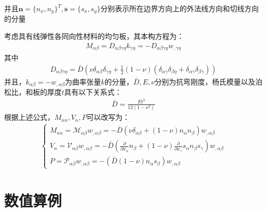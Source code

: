 \documentclass[11pt,a4paper]{article}
\begin{document}
并且$\pmb{n}=\{n_x,n_y\}^T,\pmb{s}=\{s_x,s_y\}$分别表示所在边界方向上的外法线方向和切线方向的分量\par
考虑具有线弹性各同向性材料的均匀板，其本构方程为：
\begin{equation}
    \begin{split}
    M_{\alpha\beta}=D_{\alpha\beta\gamma\eta}k_{\gamma\eta}=-D_{\alpha\beta\gamma\eta}w_{,\gamma\eta}
    \end{split}
    \end{equation}
其中
\begin{equation}
    \begin{split}
    D_{\alpha\beta\gamma\eta}=\bar D(\nu\delta_{\alpha\beta}\delta_{\gamma\eta}+\frac{1}{2}(1-\nu)(\delta_{\alpha\gamma}\delta_{\beta\eta}+\delta_{\alpha\gamma}\delta_{\beta\gamma}))
    \end{split}
    \end{equation}
并且，$k_{\alpha\beta}=-w_{,\alpha\beta}$为曲率张量$k$的分量，$\bar{D},E,\nu$分别为抗弯刚度，杨氏模量以及泊松比，和板的厚度$t$具有以下关系式：
\begin{equation}
    \begin{split}
    \bar D=\frac{Et^3}{12(1-\nu^2)}
    \end{split}
    \end{equation}
根据上述公式，$M_{nn},V_n,P$可以改写为：
\begin{equation}
    \begin{split}
    \begin{cases}
    M_{nn}=\mathcal{M}_{\alpha\beta}w_{,\alpha\beta}=-\bar D(\nu\delta_{\alpha\beta}+(1-\nu)n_{\alpha}n_{\beta})w_{,\alpha\beta}\\
    V_n=\mathcal{V}_{\alpha\beta}w_{,\alpha\beta}=-\bar D(\frac{\partial}{\partial x_{\alpha}}n_{\beta}+(1-\nu)\frac{\partial}{\partial x_{\gamma}}s_{\alpha}n_{\beta}s_{\gamma})w_{,\alpha\beta}\\
    P=\mathcal{P}_{\alpha\beta}w_{,\alpha\beta}=-(\bar D(1-\nu)n_{\alpha}s_{\beta})w_{,\alpha\beta}
    \end{cases}
    \end{split}
    \end{equation}





\section{数值算例}
\end{document}
